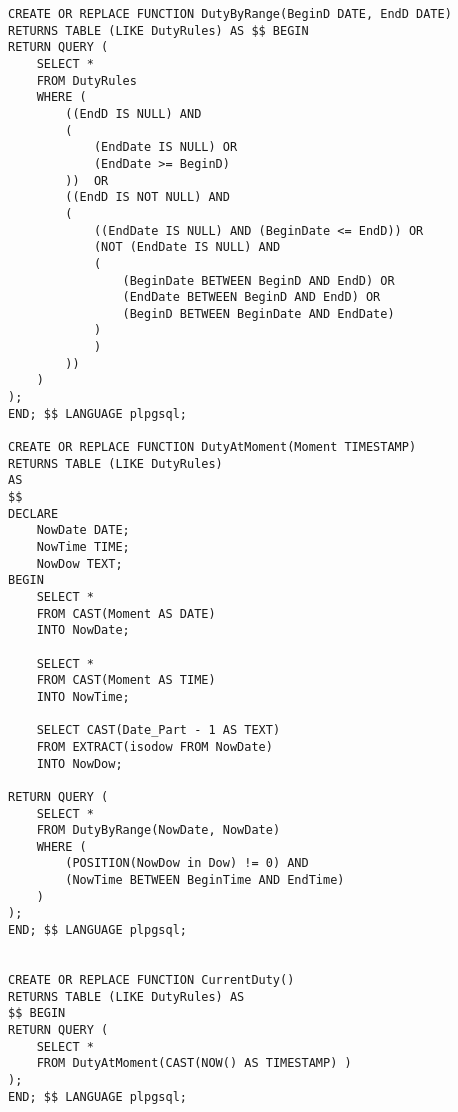 \label{attachmentA}
\begin{lstlisting}[caption = {Релизация функций для таблицы DutyDules}, label=lst:duty_rules_f]
CREATE OR REPLACE FUNCTION DutyByRange(BeginD DATE, EndD DATE)
RETURNS TABLE (LIKE DutyRules) AS $$ BEGIN
RETURN QUERY (
	SELECT *
	FROM DutyRules 
	WHERE (
		((EndD IS NULL) AND
		(
			(EndDate IS NULL) OR 
			(EndDate >= BeginD)
		))  OR
		((EndD IS NOT NULL) AND
		(
			((EndDate IS NULL) AND (BeginDate <= EndD)) OR 
			(NOT (EndDate IS NULL) AND 
			(
				(BeginDate BETWEEN BeginD AND EndD) OR
				(EndDate BETWEEN BeginD AND EndD) OR
				(BeginD BETWEEN BeginDate AND EndDate)
			)
			)
		))
	)
);
END; $$ LANGUAGE plpgsql;

CREATE OR REPLACE FUNCTION DutyAtMoment(Moment TIMESTAMP)
RETURNS TABLE (LIKE DutyRules)
AS
$$
DECLARE
	NowDate	DATE;
	NowTime TIME;
	NowDow TEXT;
BEGIN
	SELECT *
	FROM CAST(Moment AS DATE)
	INTO NowDate;

	SELECT *
	FROM CAST(Moment AS TIME)
	INTO NowTime;

	SELECT CAST(Date_Part - 1 AS TEXT)
	FROM EXTRACT(isodow FROM NowDate)
	INTO NowDow;

RETURN QUERY (
	SELECT *
	FROM DutyByRange(NowDate, NowDate) 
	WHERE (
		(POSITION(NowDow in Dow) != 0) AND
		(NowTime BETWEEN BeginTime AND EndTime)
	)
);
END; $$ LANGUAGE plpgsql;


CREATE OR REPLACE FUNCTION CurrentDuty()
RETURNS TABLE (LIKE DutyRules) AS
$$ BEGIN
RETURN QUERY (
	SELECT *
	FROM DutyAtMoment(CAST(NOW() AS TIMESTAMP) ) 
);
END; $$ LANGUAGE plpgsql;
\end{lstlisting}

